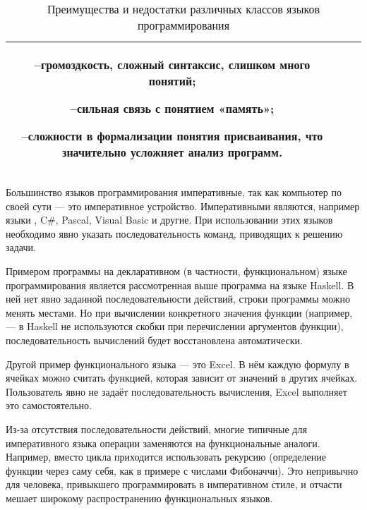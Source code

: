 \begin{table}
\begin{centering}
\begin{tabular}{|c|c|c|}
\begin{minipage}[t]{0.42\columnwidth}
        --\enskip громоздкость, сложный синтаксис, слишком много
        понятий;
        
        --\enskip сильная связь с понятием «память»;
        
        --\enskip сложности в формализации понятия присваивания, что
        значительно усложняет анализ программ.
        \par\medskip
      \end{minipage}\\
      \hline 
    \end{tabular}
    \par
  \end{centering}
  
  \caption{Преимущества и недостатки различных классов языков программирования}
  \label{tbl:PLclasses}
\end{table}


Большинство языков программирования императивные, так как компьютер по
своей сути — это императивное устройство. Императивными являются,
например языки \CPP, C\#, Pascal, Visual Basic и другие. При
использовании этих языков необходимо явно указать последовательность
команд, приводящих к решению задачи.


Примером программы на декларативном (в частности, функциональном)
языке программирования является рассмотренная выше программа на языке
Haskell. В ней нет явно заданной последовательности действий, строки
программы можно менять местами. Но при вычислении конкретного значения
функции (например,  — в Haskell не используются скобки при
перечислении аргументов функции), последовательность вычислений будет
восстановлена автоматически.

Другой пример функционального языка — это Excel. В нём каждую формулу
в ячейках можно считать функцией, которая зависит от значений в других
ячейках. Пользователь явно не задаёт последовательность вычисления,
Excel выполняет это самостоятельно.

Из-за отсутствия последовательности действий, многие типичные для
императивного языка операции заменяются на функциональные аналоги.
Например, вместо цикла приходится использовать рекурсию (определение
функции через саму себя, как в примере с числами Фибоначчи). Это
непривычно для человека, привыкшего программировать в императивном
стиле, и отчасти мешает широкому распространению функциональных
языков.

